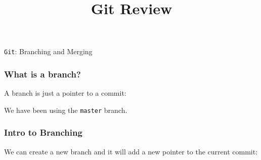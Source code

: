 \documentclass{beamer}
\title{Git Review}
\begin{document}
\begin{frame}
\begin{center}
 \texttt{Git}: Branching and Merging
\end{center}
\end{frame}

\begin{frame}
\frametitle{What is a branch?}
A branch is just a pointer to a commit:
\begin{center}

\vspace{20pt}
We have been using the \texttt{master} branch.
\end{center}

\end{frame}

\begin{frame}
\frametitle{Intro to Branching}
We can create a new branch and it will add a new pointer to the current commit:
\begin{center}

\end{center}
\end{frame}
\end{document}
